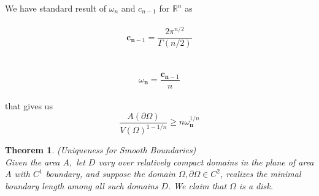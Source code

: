 \documentclass[oneside]{book}
\newtheorem{theorem}{Theorem}[section]
\theoremstyle{definition}
\begin{document}
We have standard result of $\omega_{n}$ and $c_{n-1}$ for $\mathbb{R}^{n}$ as  \\\\
    \begin{equation}
    \label{eq7}  
\mathbf{c}_{\mathbf{n}-1} = \frac{2 \pi^{n / 2}}{\Gamma(n / 2)}
    \end{equation}
    \\\\
        \begin{equation}
        \label{eq8}  
 \omega_{\mathbf{n} } = \frac{\mathbf{c}_{\mathbf{n}-1}}{n}  
    \end{equation} \\
that gives us \\
    \begin{equation}
    \label{eq9}  
 \frac{A(\partial \Omega)}{V(\Omega)^{1-1 / n}} \geq n \omega_{\mathbf{n}}^{1 / n}
    \end{equation}






\begin{theorem}
{(Uniqueness for Smooth Boundaries)}
\label{t:1} \\
 Given
the area $A,$ let $D$ vary over relatively compact domains in the plane of area $A$
with $C^{1}$ boundary, and suppose the domain $\Omega, \partial \Omega \in C^{2}$, realizes the minimal
boundary length among all such domains $D .$ We claim that $\Omega$ is a disk.
\end{theorem}
\end{document}
